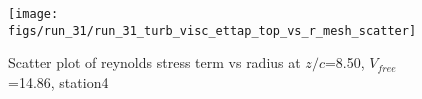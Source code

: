 \begin{figure}[H]
\centering
\texttt{[image: figs/run\_31/run\_31\_turb\_visc\_ettap\_top\_vs\_r\_mesh\_scatter]}
\caption{Scatter plot of reynolds stress term vs radius at $z/c$=8.50, $V_{free}$=14.86, station4}
\label{fig:run_31_turb_visc_ettap_top_vs_r_mesh_scatter}
\end{figure}


